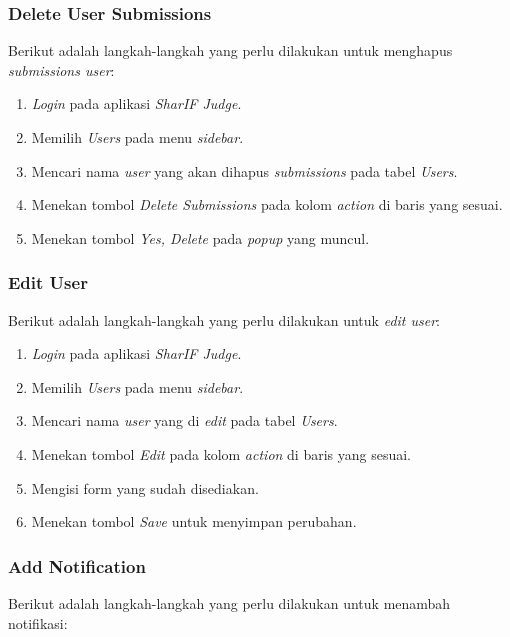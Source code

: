 \subsubsection{Delete User Submissions}
\label{subsubsec:skenario_delete_user_submissions}
Berikut adalah langkah-langkah yang perlu dilakukan untuk menghapus \textit{submissions user}:

\begin{enumerate}
	\item \textit{Login} pada aplikasi \textit{SharIF Judge}.
	\item Memilih \textit{Users} pada menu \textit{sidebar}.
	\item Mencari nama \textit{user} yang akan dihapus \textit{submissions} pada tabel \textit{Users}.
	\item Menekan tombol \textit{Delete Submissions} pada kolom \textit{action} di baris yang sesuai.
	\item Menekan tombol \textit{Yes, Delete} pada \textit{popup} yang muncul.
\end{enumerate}

\subsubsection{Edit User}
\label{subsubsec:skenario_edit_user}
Berikut adalah langkah-langkah yang perlu dilakukan untuk \textit{edit user}:

\begin{enumerate}
	\item \textit{Login} pada aplikasi \textit{SharIF Judge}.
	\item Memilih \textit{Users} pada menu \textit{sidebar}.
	\item Mencari nama \textit{user} yang di \textit{edit} pada tabel \textit{Users}.
	\item Menekan tombol \textit{Edit} pada kolom \textit{action} di baris yang sesuai.
	\item Mengisi form yang sudah disediakan.
	\item Menekan tombol \textit{Save} untuk menyimpan perubahan.
\end{enumerate}

\subsubsection{Add Notification}
\label{subsubsec:skenario_add_notification}
Berikut adalah langkah-langkah yang perlu dilakukan untuk menambah notifikasi:

